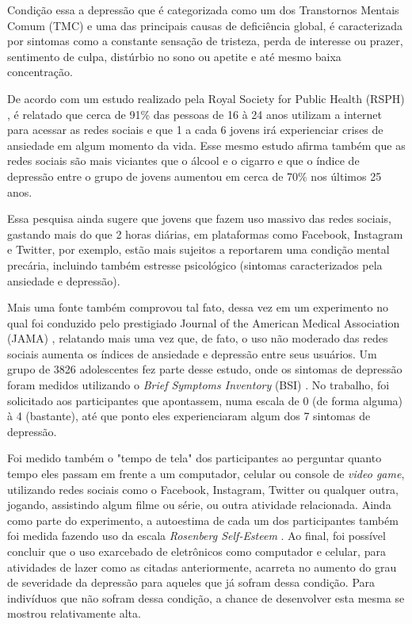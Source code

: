 \documentclass[conference]{IEEEtran}
\begin{document}
Condição essa a depressão que é categorizada como um dos Transtornos Mentais Comum (TMC) \cite{CMD} e uma das principais causas de deficiência global, é caracterizada por sintomas como a constante sensação de tristeza, perda de interesse ou prazer, sentimento de culpa, distúrbio no sono ou apetite e até mesmo baixa concentração.

De acordo com um estudo realizado pela Royal Society for Public Health (RSPH) \cite{RSPH}, é relatado que cerca de 91\% das pessoas de 16 à 24 anos utilizam a internet para acessar as redes sociais e que 1 a cada 6 jovens irá experienciar crises de ansiedade em algum momento da vida. Esse mesmo estudo afirma também que as redes sociais são mais viciantes que o álcool e o cigarro e que o índice de depressão entre o grupo de jovens aumentou em cerca de 70\% nos últimos 25 anos.

Essa pesquisa ainda sugere que jovens que fazem uso massivo das redes sociais, gastando mais do que 2 horas diárias, em plataformas como Facebook, Instagram e Twitter, por exemplo, estão mais sujeitos a reportarem uma condição mental precária, incluindo também estresse psicológico (sintomas caracterizados pela ansiedade e depressão).

Mais uma fonte também comprovou tal fato, dessa vez em um experimento no qual foi conduzido pelo prestigiado Journal of the American Medical Association (JAMA) \cite{JAMA}, relatando mais uma vez que, de fato, o uso não moderado das redes sociais aumenta os índices de ansiedade e depressão entre seus usuários. Um grupo de 3826 adolescentes fez parte desse estudo, onde os sintomas de depressão foram medidos utilizando o \textit{Brief Symptoms Inventory} (BSI) \cite{Derogatis}. No trabalho, foi solicitado aos participantes que apontassem, numa escala de 0 (de forma alguma) à 4 (bastante), até que ponto eles experienciaram algum dos 7 sintomas de depressão.

Foi medido também o "tempo de tela" dos participantes ao perguntar quanto tempo eles passam em frente a um computador, celular ou console de \textit{video game}, utilizando redes sociais como o Facebook, Instagram, Twitter ou qualquer outra, jogando, assistindo algum filme ou série, ou outra atividade relacionada. Ainda como parte do experimento, a autoestima de cada um dos participantes também foi medida fazendo uso da escala \textit{Rosenberg Self-Esteem} \cite{Rosenberg}. Ao final, foi possível concluir que o uso exarcebado de eletrônicos como computador e celular, para atividades de lazer como as citadas anteriormente, acarreta no aumento do grau de severidade da depressão para aqueles que já sofram dessa condição. Para indivíduos que não sofram dessa condição, a chance de desenvolver esta mesma se mostrou relativamente alta.
\end{document}

